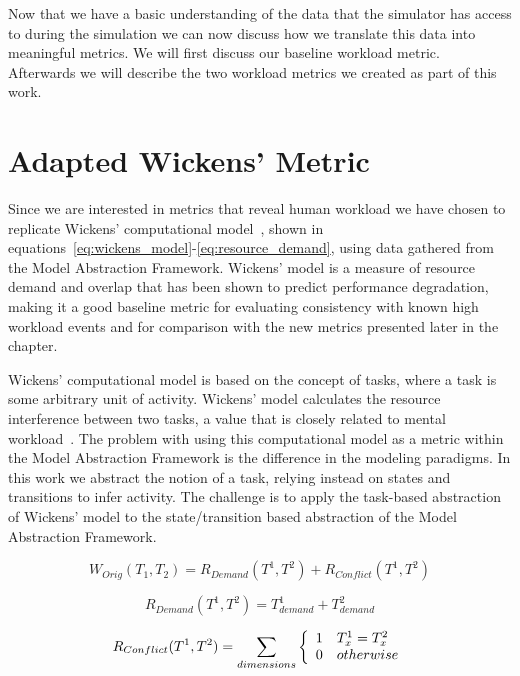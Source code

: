 Now that we have a basic understanding of the data that the simulator has access to during the simulation we can now discuss how we translate this data into meaningful metrics.  We will first discuss our baseline workload metric.  Afterwards we will describe the two workload metrics we created as part of this work.


\section{Adapted Wickens' Metric}
Since we are interested in metrics that reveal human workload we have chosen to replicate Wickens' computational model~\cite{wickens2002multiple}, shown in equations~\ref{eq:wickens_model}-\ref{eq:resource_demand}, using data gathered from the Model Abstraction Framework.  Wickens' model is a measure of resource demand and overlap that has been shown to predict performance degradation, making it a good baseline metric for evaluating consistency with known high workload events and for comparison with the new metrics presented later in the chapter.  

Wickens' computational model is based on the concept of tasks, where a task is some arbitrary unit of activity.  Wickens' model calculates the resource interference between two tasks, a value that is closely related to mental workload~\cite{wickens2002multiple}.  The problem with using this computational model as a metric within the Model Abstraction Framework is the difference in the modeling paradigms.  In this work we abstract the notion of a task, relying instead on states and transitions to infer activity.  The challenge is to apply the task-based abstraction of Wickens' model to the state/transition based abstraction of the Model Abstraction Framework.

\begin{equation}
  W_{Orig}(T_{1}, T_{2}) = R_{Demand}(T^{1}, T^{2}) + R_{Conflict}(T^{1}, T^{2})
  \label{eq:wickens_model}
\end{equation}

\begin{equation}
  R_{Demand}(T^{1}, T^{2}) = T_{demand}^{1} + T_{demand}^{2}
  \label{eq:resource_demand}
\end{equation}

\begin{equation}
  R_{Conflict}(T^{1}, T^{2}) = \sum_{dimensions} \left\{
    \begin{array}{l l}
      1 & T_{x}^{1} = T_{x}^{2} \\
      0 & otherwise \\
    \end{array}
    \right.
  \label{eq:resource_conflict}
\end{equation}

